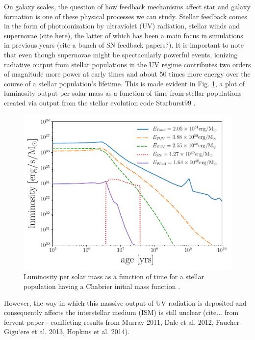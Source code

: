 \documentclass[fleq,usenatbib]{mnras}
\begin{document}
On galaxy scales, the question of how feedback mechanisms affect star and 
galaxy formation is one of these physical processes we can study. Stellar 
feedback comes in the form of photoionization by ultraviolet (UV) radiation, 
stellar winds and supernovae (cite here), the latter of which has been 
a main focus in simulations in previous years (cite a bunch of SN feedback 
papers?). It is important to note that even though supernovae might be 
spectacularly powerful events, ionizing radiative output from stellar 
populations in the UV regime contributes two orders of magnitude more power at 
early times and about 50 times more energy over the course of a stellar 
population's lifetime. This is made evident in Fig. \ref{fig:uvsn}, a 
plot of luminosity output per solar mass as a function of time from stellar 
populations created via output from the stellar evolution code Starburst99 
\citep{leithererEt99}. 
\begin{figure}
\includegraphics[width=1\linewidth]{Figures/uvsn.pdf}
\caption{Luminosity per solar mass as a function of time for a stellar 
population having a Chabrier initial mass function \citep{chabrier03}.}
\label{fig:uvsn}
\end{figure}
However, the way in which this massive output of UV radiation is deposited 
and consequently affects the interstellar medium (ISM) is still unclear 
(cite... from fervent paper - conflicting results from Murray 2011, Dale 
et al. 2012, Faucher-Gigu`ere et al. 2013, Hopkins et al. 2014).
\end{document}
